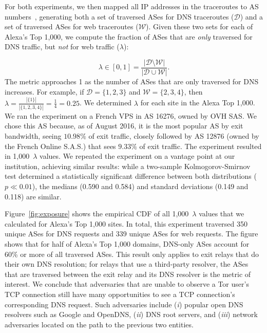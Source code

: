 For both experiments, we then mapped all IP addresses in the traceroutes to AS
numbers~\cite{ipasn}, generating both a set of traversed ASes for DNS traceroutes
($\mathcal{D}$) and a set of traversed ASes for web traceroutes
($\mathcal{W}$).  Given these two sets for each of Alexa's Top
1,000, we compute the fraction of ASes that are \emph{only}
traversed for DNS traffic, but \emph{not} for web traffic ($\lambda$):

\begin{equation}
\label{equ:exposure}
\lambda \in [0, 1] =
\frac{|\mathcal{D} \setminus \mathcal{W}|}
     {|\mathcal{D} \cup \mathcal{W}|}.
\end{equation}
\noindent
The metric approaches 1 as the number of ASes that are only traversed for DNS
increases.  For example, if $\mathcal{D} = \{1,2,3\}$ and $\mathcal{W} =
\{2,3,4\}$, then $\lambda = \frac{|\{1\}|}{|\{1,2,3,4\}|} = \frac{1}{4} =
0.25$.  We determined $\lambda$ for each site in the Alexa Top 1,000.  We ran
the experiment on a French VPS in AS 16276, owned by OVH SAS.  We chose this AS
because, as of August 2016, it is the most popular AS by exit bandwidth, seeing
$10.98\%$ of exit traffic, closely followed by AS 12876 (owned by the French
Online S.A.S.) that sees $9.33\%$ of exit traffic.  The experiment resulted in
1,000~$\lambda$ values.  We repeated the experiment on a vantage point at our
institution, achieving similar results: while a two-sample Kolmogorov-Smirnov
test determined a statistically significant difference between both
distributions ($p \ll 0.01$), the medians (0.590 and 0.584) and standard
deviations (0.149 and 0.118) are similar.
%
%

Figure~\ref{fig:exposure} shows the empirical CDF of all 1,000~$\lambda$ values
that we calculated for Alexa's Top 1,000 sites.  In total, this experiment
traversed 350 unique ASes for DNS requests and 339 unique ASes for web requests.
The figure shows that for half of Alexa's Top 1,000 domains, DNS-only ASes
account for 60\% or more of all traversed ASes.  This result
only applies to exit relays that do their own DNS resolution; for relays that
use a third-party resolver, the ASes that are traversed between
the exit relay and its DNS resolver is the metric of interest.  We conclude that adversaries that are
unable to observe a Tor user's TCP connection still have many opportunities to
see a TCP connection's corresponding DNS request.  Such adversaries include (\emph{i}) popular open
DNS resolvers such as Google and OpenDNS, (\emph{ii}) DNS root servers, and
(\emph{iii}) network adversaries located on the path to the previous two
entities.

